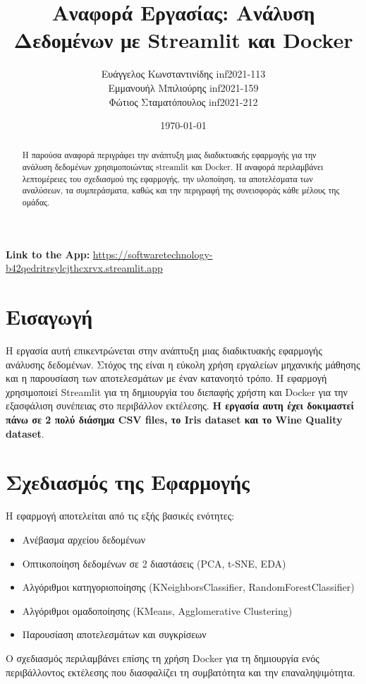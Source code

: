 \documentclass[a4paper,12pt]{article}
\title{Αναφορά Εργασίας: Ανάλυση Δεδομένων με \textlatin{Streamlit} και \textlatin{Docker}}
\author{Ευάγγελος Κωνσταντινίδης \textlatin{inf2021-113} \\
        Εμμανουήλ Μπιλιούρης \textlatin{inf2021-159} \\
        Φώτιος Σταματόπουλος \textlatin{inf2021-212}}
\date{\today}
\begin{document}

\maketitle

\begin{center}
    \textbf{\textlatin{Link to the App}:} \href{https://softwaretechnology-b42qedritrsylcjthcxrvx.streamlit.app}{\textlatin{https://softwaretechnology-b42qedritrsylcjthcxrvx.streamlit.app}}
\end{center}

\begin{abstract}
Η παρούσα αναφορά περιγράφει την ανάπτυξη μιας διαδικτυακής εφαρμογής για την ανάλυση δεδομένων χρησιμοποιώντας \textlatin{streamlit} και \textlatin{Docker}. Η αναφορά περιλαμβάνει λεπτομέρειες του σχεδιασμού της εφαρμογής, την υλοποίηση, τα αποτελέσματα των αναλύσεων, τα συμπεράσματα, καθώς και την περιγραφή της συνεισφοράς κάθε μέλους της ομάδας.
\end{abstract}

\tableofcontents
\newpage

\section{Εισαγωγή}
\label{sec:intro}
Η εργασία αυτή επικεντρώνεται στην ανάπτυξη μιας διαδικτυακής εφαρμογής ανάλυσης δεδομένων. Στόχος της είναι η εύκολη χρήση εργαλείων μηχανικής μάθησης και η παρουσίαση των αποτελεσμάτων με έναν κατανοητό τρόπο. Η εφαρμογή χρησιμοποιεί \textlatin{Streamlit} για τη δημιουργία του διεπαφής χρήστη και \textlatin{Docker} για την εξασφάλιση συνέπειας στο περιβάλλον εκτέλεσης. \textbf{Η εργασία αυτη έχει δοκιμαστεί πάνω σε 2 πολύ διάσημα \textlatin{CSV files}, το \textlatin{Iris dataset} και το \textlatin{Wine Quality dataset}}.

\section{Σχεδιασμός της Εφαρμογής}
\label{sec:design}
Η εφαρμογή αποτελείται από τις εξής βασικές ενότητες:
\begin{itemize}
    \item Ανέβασμα αρχείου δεδομένων
    \item Οπτικοποίηση δεδομένων σε 2 διαστάσεις (\textlatin{PCA}, \textlatin{t-SNE}, \textlatin{EDA})
    \item Αλγόριθμοι κατηγοριοποίησης (\textlatin{KNeighborsClassifier}, \textlatin{RandomForestClassifier})
    \item Αλγόριθμοι ομαδοποίησης (\textlatin{KMeans}, \textlatin{Agglomerative Clustering})
    \item Παρουσίαση αποτελεσμάτων και συγκρίσεων
\end{itemize}
Ο σχεδιασμός περιλαμβάνει επίσης τη χρήση \textlatin{Docker} για τη δημιουργία ενός περιβάλλοντος εκτέλεσης που διασφαλίζει τη συμβατότητα και την επαναληψιμότητα.
\end{document}
